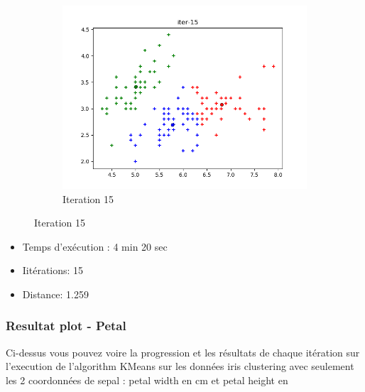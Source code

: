 \documentclass[french]{article}
\begin{document}
\begin{figure}[h!]
\centering
\begin{subfigure}{.5\textwidth}
  \centering
  \includegraphics[width=\linewidth]{img/iter-15.png}
  \caption{Iteration 15}
\end{subfigure}%
\end{figure}

\begin{itemize}
\item Temps d'exécution : 4 min 20 sec
\item Iitérations: 15
\item Distance: 1.259
\end{itemize}


\newpage
\subsubsection{Resultat plot - Petal}
Ci-dessus vous pouvez voire la progression et les résultats de chaque itération sur l'execution de l'algorithm KMeans sur les données iris clustering avec seulement les 2 coordonnées  de sepal : petal width en cm et petal height en 
\end{document}
